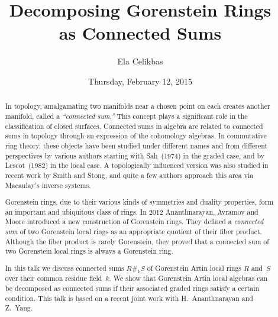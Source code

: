 \documentclass{UAmathtalk}
\author{Ela Celikbas}
\title{Decomposing Gorenstein Rings\\ as Connected Sums}
\date{Thursday, February 12, 2015}
\begin{document}
\maketitle

\begin{abstract}
In topology, amalgamating two manifolds near a chosen point on each creates another manifold, called a \emph{``connected sum.''} This concept plays a significant role in the classification of closed surfaces. Connected sums in algebra are related to connected sums in topology through an expression of the cohomology algebras. In commutative ring theory, these objects have been studied under different names and from different perspectives by various authors starting with Sah~(1974) in the graded case, and by Lescot~(1982) in the local case. A topologically influenced version was also studied in recent work by Smith and Stong, and quite a few authors approach this area via Macaulay's inverse systems.

Gorenstein rings, due to their various kinds of symmetries and duality properties, form an important and ubiquitous class of rings. In 2012 Ananthnarayan, Avramov and Moore introduced a new construction of Gorenstein rings. They defined a \emph{connected sum} of two Gorenstein local rings as an appropriate quotient of their fiber product. Although the fiber product is rarely Gorenstein, they proved that a connected sum of two Gorenstein local rings is always a Gorenstein ring. 

In this talk we discuss connected sums $R\#_k S$ of Gorenstein Artin local rings $R$ and~$S$ over their common residue field~$k$. We show that Gorenstein Artin local algebras can be decomposed as connected sums if their associated graded rings satisfy a certain condition. This talk is based on a recent joint work with H.~Ananthnarayan and Z.~Yang.
\end{abstract}
\end{document}
